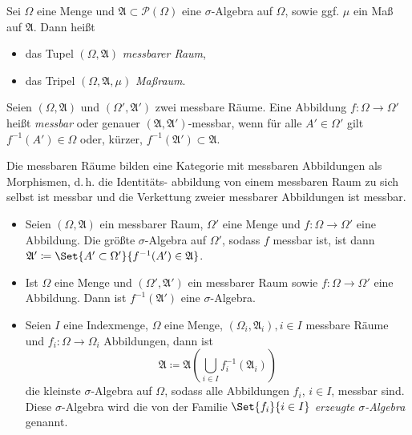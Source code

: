 \documentclass{cheat-sheet}
\newcommand{\PS}{\mathcal{P}} %
\newcommand{\PSO}{\PS(\Omega)} %
\newcommand{\Alg}{\mathfrak{A}} %
\theoremstyle{definition}
\begin{document}
\begin{defn}
  Sei $\Omega$ eine Menge und $\Alg \subset \PSO$ eine $\sigma$-Algebra auf $\Omega$, sowie ggf. $\mu$ ein Maß auf $\Alg$. Dann heißt
  \begin{itemize}
    \item das Tupel $(\Omega, \Alg)$ \emph{messbarer Raum},
    \item das Tripel $(\Omega, \Alg, \mu)$ \emph{Maßraum}.
  \end{itemize}
\end{defn}


\begin{defn}
  Seien $(\Omega, \Alg)$ und $(\Omega', \Alg')$ zwei messbare Räume. Eine Abbildung $f : \Omega \to \Omega'$ heißt \emph{messbar} oder genauer $(\Alg, \Alg')$-messbar, wenn für alle $A' \in \Omega'$ gilt $f^{-1}(A') \in \Omega$ oder, kürzer, $f^{-1}(\Alg') \subset \Alg$.
\end{defn}

\begin{bem}
  Die messbaren Räume bilden eine Kategorie mit messbaren Abbildungen als Morphismen, d.\,h. die Identitäts- abbildung von einem messbaren Raum zu sich selbst ist messbar und die Verkettung zweier messbarer Abbildungen ist messbar.
\end{bem}


\begin{satz}
  \begin{itemize}
    \item Seien $(\Omega, \Alg)$ ein messbarer Raum, $\Omega'$ eine Menge und $f : \Omega \to \Omega'$ eine Abbildung. Die größte $\sigma$-Algebra auf $\Omega'$, sodass $f$ messbar ist, ist dann $\Alg' \coloneqq \Set{ A' \subset \Omega' }{ f^{-1}(A') \in \Alg }$.
    \item Ist $\Omega$ eine Menge und $(\Omega', \Alg')$ ein messbarer Raum sowie $f : \Omega \to \Omega'$ eine Abbildung. Dann ist $f^{-1}(\Alg')$ eine $\sigma$-Algebra.
    \item Seien $I$ eine Indexmenge, $\Omega$ eine Menge, $(\Omega_i, \Alg_i), i \in I$ messbare Räume und $f_i : \Omega \to \Omega_i$ Abbildungen, dann ist
    \[ \Alg \coloneqq \Alg\left( \bigcup_{i \in I} f_i^{-1}(\Alg_i) \right) \]
    die kleinste $\sigma$-Algebra auf $\Omega$, sodass alle Abbildungen $f_i$, $i \in I$, messbar sind. Diese $\sigma$-Algebra wird die von der Familie $\Set{ f_i }{i \in I}$ \emph{erzeugte $\sigma$-Algebra} genannt.
  \end{itemize}
\end{satz}
\end{document}
